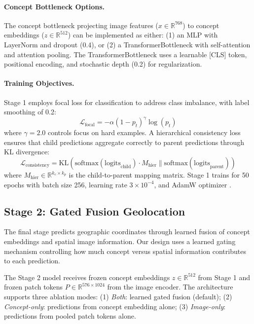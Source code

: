 \documentclass{uva-inf-article}
\begin{document}
\paragraph{Concept Bottleneck Options.}
The concept bottleneck projecting image features ($x \in \mathbb{R}^{768}$) to concept embeddings ($z \in \mathbb{R}^{512}$) can be implemented as either: (1) an MLP with LayerNorm and dropout (0.4), or (2) a TransformerBottleneck with self-attention and attention pooling. The TransformerBottleneck uses a learnable [CLS] token, positional encoding, and stochastic depth (0.2) for regularization.

\paragraph{Training Objectives.}
Stage 1 employs focal loss \parencite{lin2017focal} for classification to address class imbalance, with label smoothing of 0.2:
\begin{equation}
\mathcal{L}_{\text{focal}} = -\alpha(1-p_t)^\gamma \log(p_t)
\end{equation}
where $\gamma = 2.0$ controls focus on hard examples. A hierarchical consistency loss ensures that child predictions aggregate correctly to parent predictions through KL divergence:
\begin{equation}
\mathcal{L}_{\text{consistency}} = \text{KL}(\text{softmax}(\text{logits}_{\text{child}}) \cdot M_{\text{hier}} \| \text{softmax}(\text{logits}_{\text{parent}}))
\end{equation}
where $M_{\text{hier}} \in \mathbb{R}^{k_c \times k_p}$ is the child-to-parent mapping matrix. Stage 1 trains for 50 epochs with batch size 256, learning rate $3 \times 10^{-4}$, and AdamW optimizer \parencite{loshchilov2017adamw}.


\subsection{Stage 2: Gated Fusion Geolocation}

The final stage predicts geographic coordinates through learned fusion of concept embeddings and spatial image information. Our design uses a learned gating mechanism controlling how much concept versus spatial information contributes to each prediction.

The Stage 2 model receives frozen concept embeddings $z \in \mathbb{R}^{512}$ from Stage 1 and frozen patch tokens $P \in \mathbb{R}^{576 \times 1024}$ from the image encoder. The architecture supports three ablation modes: (1) \textit{Both}: learned gated fusion (default); (2) \textit{Concept-only}: predictions from concept embedding alone; (3) \textit{Image-only}: predictions from pooled patch tokens alone.
\end{document}
